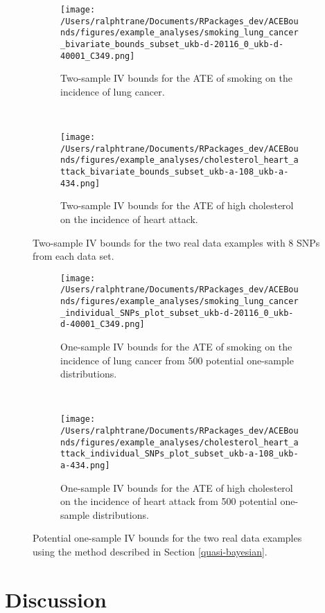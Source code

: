 \documentclass[
]{article}
\theoremstyle{plain}
\begin{document}
\begin{figure*}
  \centering
  \begin{subfigure}{0.5\linewidth}
  \texttt{[image: /Users/ralphtrane/Documents/RPackages\_dev/ACEBounds/figures/example\_analyses/smoking\_lung\_cancer\_bivariate\_bounds\_subset\_ukb-d-20116\_0\_ukb-d-40001\_C349.png]}
  \caption{Two-sample IV bounds for the ATE of smoking on the incidence of lung cancer.}
  \label{fig:two-sample-bounds-smoking}
  \end{subfigure}%
  ~
  \begin{subfigure}{0.5\linewidth}
  \texttt{[image: /Users/ralphtrane/Documents/RPackages\_dev/ACEBounds/figures/example\_analyses/cholesterol\_heart\_attack\_bivariate\_bounds\_subset\_ukb-a-108\_ukb-a-434.png]}
  \caption{Two-sample IV bounds for the ATE of high cholesterol on the incidence of heart attack.}
  \label{fig:two-sample-bounds-cholesterol}
  \end{subfigure}
  \caption{Two-sample IV bounds for the two real data examples with 8 SNPs from each data set.}
  \label{fig:two-sample-bounds}
\end{figure*}

\begin{figure*}
  \centering
  \begin{subfigure}{0.5\linewidth}
  \texttt{[image: /Users/ralphtrane/Documents/RPackages\_dev/ACEBounds/figures/example\_analyses/smoking\_lung\_cancer\_individual\_SNPs\_plot\_subset\_ukb-d-20116\_0\_ukb-d-40001\_C349.png]}
  \caption{One-sample IV bounds for the ATE of smoking on the incidence of lung cancer from 500 potential one-sample distributions.}
  \label{fig:one-sample-bounds-smoking}
  \end{subfigure}%
  ~
  \begin{subfigure}{0.5\linewidth}
  \texttt{[image: /Users/ralphtrane/Documents/RPackages\_dev/ACEBounds/figures/example\_analyses/cholesterol\_heart\_attack\_individual\_SNPs\_plot\_subset\_ukb-a-108\_ukb-a-434.png]}
  \caption{One-sample IV bounds for the ATE of high cholesterol on the incidence of heart attack from 500 potential one-sample distributions.}
  \label{fig:one-sample-bounds-cholesterol}
  \end{subfigure}
  \caption{Potential one-sample IV bounds for the two real data examples using the method described in Section \ref{quasi-bayesian}.}
  \label{fig:one-sample-bounds}
\end{figure*}

\hypertarget{discussion}{%
\section{\texorpdfstring{Discussion \label{conclusion-and-practical-considerations}}{Discussion }}\label{discussion}}
\end{document}
